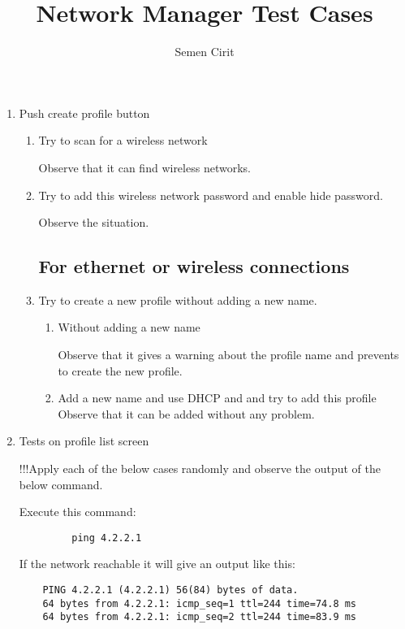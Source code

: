 \documentclass[a4paper,10pt]{article}
\title{Network Manager Test Cases}
\author{Semen Cirit}
\begin{document}
\maketitle

\begin{enumerate}
  \item Push create profile button
    \begin{enumerate}
     \subsection*{For wireless connections}
     \item Try to scan for a wireless network
      
	Observe that it can find wireless networks.
     \item Try to add this wireless network password and enable hide password.
        
	Observe the situation.
     \subsection*{For ethernet or wireless connections}
	
      \item Try to create a new profile without adding a new name.
	\begin{enumerate}
	  \item  Without adding a new name

		Observe that it gives a warning about the profile name and prevents to create the new profile.
	  \item Add a new name and use DHCP and  and try to add this profile
		Observe that it can be added without any problem.
	\end{enumerate}
      
     \end{enumerate}
     \item Tests on profile list screen
     
      !!!Apply each of the below cases randomly and observe the output of the below command.

		Execute this command:
		\begin{verbatim}
		 ping 4.2.2.1
		\end{verbatim}
	If the network reachable it will give an output like this:
	\begin{verbatim}
	PING 4.2.2.1 (4.2.2.1) 56(84) bytes of data.
	64 bytes from 4.2.2.1: icmp_seq=1 ttl=244 time=74.8 ms
	64 bytes from 4.2.2.1: icmp_seq=2 ttl=244 time=83.9 ms
      	\end{verbatim}


\end{enumerate}
\end{document}

